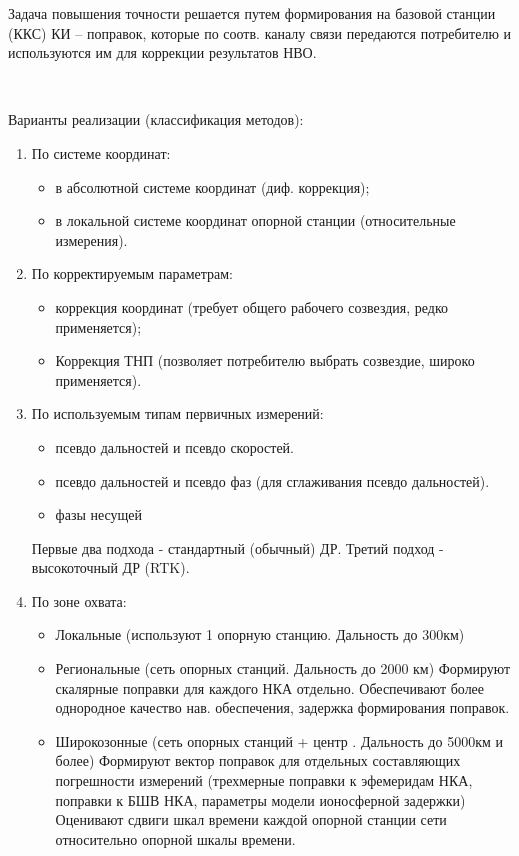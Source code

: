 \documentclass[14pt,a4paper,oneside]{extarticle}
\begin{document}
Задача повышения точности решается путем формирования на базовой станции (ККС) КИ – поправок, которые по соотв. каналу связи передаются потребителю и используются им для коррекции результатов НВО.

\

Варианты реализации (классификация методов):

\begin{enumerate}
    \item По системе координат:
          \begin{itemize}
              \item в абсолютной системе координат (диф. коррекция);
              \item в локальной системе координат опорной станции (относительные измерения).
          \end{itemize}
    \item По корректируемым параметрам:
          \begin{itemize}
              \item коррекция координат (требует общего рабочего созвездия, редко применяется);
              \item Коррекция ТНП (позволяет потребителю выбрать созвездие, широко применяется).
          \end{itemize}
    \item По используемым типам первичных измерений:
          \begin{itemize}
              \item псевдо дальностей и псевдо скоростей.
              \item псевдо дальностей и псевдо фаз (для сглаживания псевдо дальностей).
              \item фазы несущей
          \end{itemize}
          Первые два подхода - стандартный (обычный) ДР.
          Третий подход - высокоточный ДР (RTK).
    \item По зоне охвата:
          \begin{itemize}
              \item Локальные (используют 1 опорную станцию. Дальность до 300км)
              \item Региональные (сеть опорных станций. Дальность до 2000 км) Формируют скалярные поправки для каждого НКА отдельно. Обеспечивают более однородное качество нав. обеспечения, задержка формирования поправок.
              \item Широкозонные (сеть опорных станций + центр . Дальность до 5000км и более) Формируют вектор поправок для отдельных составляющих погрешности измерений (трехмерные поправки к эфемеридам НКА, поправки к БШВ НКА, параметры модели ионосферной задержки) Оценивают сдвиги шкал времени каждой опорной станции сети относительно опорной шкалы времени.
          \end{itemize}
\end{enumerate}
\end{document}
